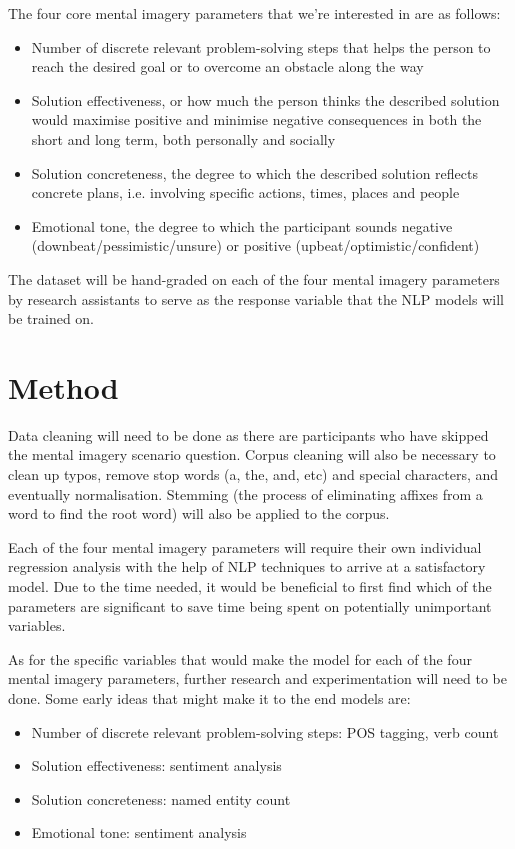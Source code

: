 \documentclass[12pt, a4paper]{article}
\begin{document}
The four core mental imagery parameters that we're interested in are as follows:
\begin{itemize}
	\item Number of discrete relevant problem-solving steps that helps the person to reach the desired goal or to overcome an obstacle along the way
	\item Solution effectiveness, or how much the person thinks the described solution would maximise positive and minimise negative consequences in both the short and long term, both personally and socially
	\item Solution concreteness, the degree to which the described solution reflects concrete plans, i.e. involving specific actions, times, places and people
	\item Emotional tone, the degree to which the participant sounds negative (downbeat/pessimistic/unsure) or positive (upbeat/optimistic/confident)
\end{itemize}

The dataset will be hand-graded on each of the four mental imagery parameters by research assistants to serve as the response variable that the NLP models will be trained on. 
 
\section*{Method}
Data cleaning will need to be done as there are participants who have skipped the mental imagery scenario question. Corpus cleaning will also be necessary to clean up typos, remove stop words (a, the, and, etc) and special characters, and eventually normalisation. Stemming (the process of eliminating affixes from a word to find the root word) will also be applied to the corpus.

Each of the four mental imagery parameters will require their own individual regression analysis with the help of NLP techniques to arrive at a satisfactory model. Due to the time needed, it would be beneficial to first find which of the parameters are significant to save time being spent on potentially unimportant variables.

As for the specific variables that would make the model for each of the four mental imagery parameters, further research and experimentation will need to be done. Some early ideas that might make it to the end models are: 

\begin{itemize}
	\item Number of discrete relevant problem-solving steps: POS tagging, verb count
	\item Solution effectiveness: sentiment analysis
	\item Solution concreteness: named entity count
	\item Emotional tone: sentiment analysis
\end{itemize}
\end{document}
